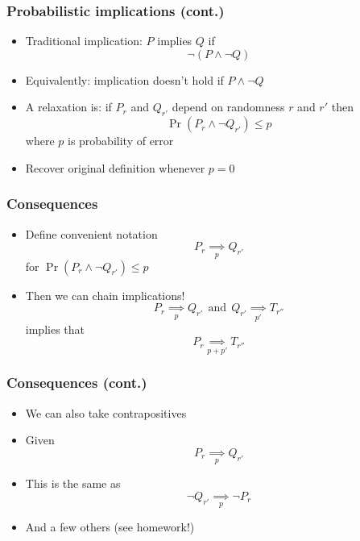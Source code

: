 \documentclass{beamer}
\newcommand{\impliesn}[1]{\underset{#1}{\implies}}
\newcommand{\impliesp}{\impliesn{p}}
\newcommand{\impliespp}{\impliesn{p'}}
\begin{document}
    \begin{frame}
        \frametitle{Probabilistic implications (cont.)}
        \begin{itemize}\itemsep=12pt
            \item Traditional implication: $P$ implies $Q$ if
            \[
                \neg(P \wedge \neg Q)
            \]
            \item Equivalently: implication doesn't hold if $P \wedge \neg Q$
            \pause
            \item A relaxation is: if $P_r$ and $Q_{r'}$ depend on randomness $r$ and $r'$
            then
            \[
                \Pr(P_r \wedge \neg Q_{r'}) \le p
            \]
            where $p$ is probability of error
            \item Recover original definition whenever $p=0$
        \end{itemize}
    \end{frame}

    \begin{frame}
        \frametitle{Consequences}
        \begin{itemize}\itemsep=12pt
            \item Define convenient notation
            \[
                P_r \impliesp Q_{r'}
            \]
            for $\Pr(P_r \wedge \neg Q_{r'}) \le p$
            \item Then we can chain implications!
            \[
                P_r \impliesp Q_{r'} ~~ \text{and} ~~ Q_{r'} \impliespp T_{r''}
            \]
            implies that
            \[
                P_r \impliesn{p + p'} T_{r''}
            \]
        \end{itemize}
    \end{frame}

    \begin{frame}
        \frametitle{Consequences (cont.)}
        \begin{itemize}\itemsep=12pt
            \item We can also take contrapositives
            \item Given
            \[
                P_r \impliesp Q_{r'}
            \]
            \item This is the same as
            \[
                \neg Q_{r'} \impliesp \neg P_r
            \]
            \item And a few others (see homework!)
        \end{itemize}
    \end{frame}
\end{document}
